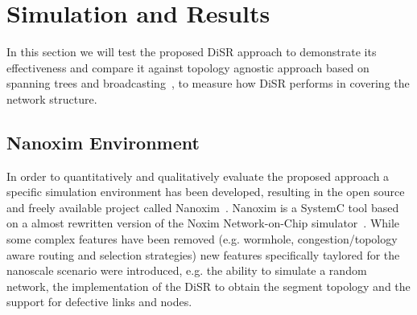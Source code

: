 
\section{Simulation and Results}
\label{sec:simulation}

In this section we will test the proposed DiSR approach to demonstrate
its effectiveness and compare it against topology agnostic approach
based on spanning trees and
broadcasting~\cite{Patwardhan05evaluatingthe}, to measure how DiSR
performs in covering the network structure.


\subsection{Nanoxim Environment}

In order to quantitatively and qualitatively evaluate the proposed approach a
specific simulation environment has been developed, resulting in
the open source and freely available project called
Nanoxim~\cite{nanoxim}.
Nanoxim is a SystemC tool based on a almost rewritten
version of the Noxim Network-on-Chip simulator~\cite{noxim}. While some
complex features have been removed (e.g. wormhole, congestion/topology
aware routing and selection strategies) new features specifically
taylored for the nanoscale scenario were introduced, e.g. the ability to simulate a random
network, the implementation of the DiSR to obtain the segment topology
and the support for defective links and nodes.


